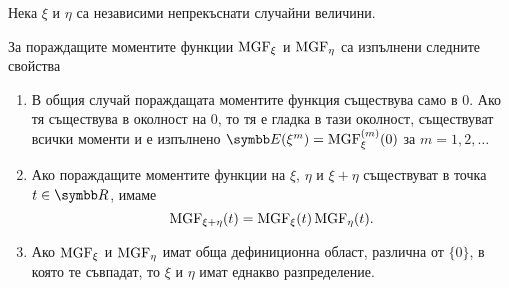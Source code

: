 \documentclass[numbers=endperiod, bibliography=totocnumbered]{scrartcl}
\begin{document}
\begin{theorem}\label{thm:mgf_properties}
  Нека \( \xi \) и \( \eta \) са независими непрекъснати случайни величини.

  За пораждащите моментите функции \( \operatorname{MGF}_\xi \) и \( \operatorname{MGF}_\eta \) са изпълнени следните свойства
  \begin{enumerate}
    \item В общия случай пораждащата моментите функция съществува само в \( 0 \). Ако тя съществува в околност на \( 0 \), то тя е гладка в тази околност, съществуват всички моменти и е изпълнено \( \Expect(\xi^m) = \MGF_\xi^{(m)} (0) \) за \( m = 1, 2, \ldots \)

    \item Ако пораждащите моментите функции на \( \xi \), \( \eta \) и \( \xi + \eta \) съществуват в точка \( t \in \R \), имаме
    \begin{equation*}
      \operatorname{MGF}_{\xi + \eta}(t) = \operatorname{MGF}_\xi(t) \operatorname{MGF}_\eta(t).
    \end{equation*}

    \item Ако \( \operatorname{MGF}_\xi \) и \( \operatorname{MGF}_\eta \) имат обща дефиниционна област, различна от \( \{ 0 \} \), в която те съвпадат, то \( \xi \) и \( \eta \) имат еднакво разпределение.
  \end{enumerate}
\end{theorem}
\end{document}
